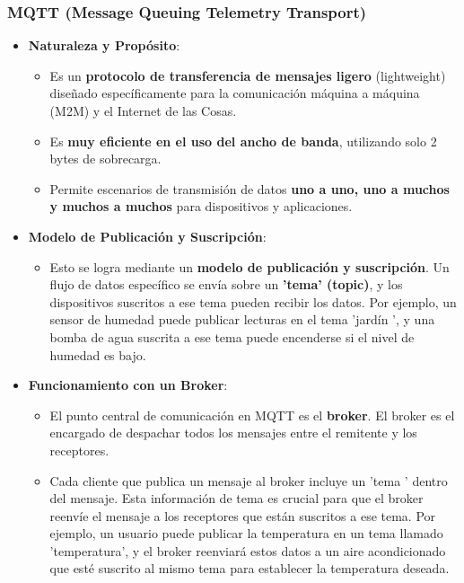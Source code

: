 \documentclass{report}
\begin{document}
\subsubsection{MQTT (Message Queuing Telemetry Transport)}
\begin{itemize}
    \item \textbf{Naturaleza y Propósito}:
    \begin{itemize}
        \item Es un \textbf{protocolo de transferencia de mensajes ligero} (lightweight) diseñado específicamente para la comunicación máquina a 
        máquina (M2M) y el Internet de las Cosas.
        \item Es \textbf{muy eficiente en el uso del ancho de banda}, utilizando solo 2 bytes de sobrecarga.
        \item Permite escenarios de transmisión de datos \textbf{uno a uno, uno a muchos y muchos a muchos} para dispositivos y aplicaciones.
    \end{itemize}

    \item \textbf{Modelo de Publicación y Suscripción}:
    \begin{itemize}
        \item Esto se logra mediante un \textbf{modelo de publicación y suscripción}. Un flujo de datos específico se envía sobre un 
        \textbf{'tema' (topic)}, y los dispositivos suscritos a ese tema pueden recibir los datos. Por ejemplo, un sensor de humedad puede publicar 
        lecturas en el tema  'jardín ', y una bomba de agua suscrita a ese tema puede encenderse si el nivel de humedad es bajo.
    \end{itemize}

    \item \textbf{Funcionamiento con un Broker}:
    \begin{itemize}
        \item El punto central de comunicación en MQTT es el \textbf{broker}. El broker es el encargado de despachar todos los mensajes entre el 
        remitente y los receptores.
        \item Cada cliente que publica un mensaje al broker incluye un  'tema ' dentro del mensaje. Esta información de tema es crucial para que el 
        broker reenvíe el mensaje a los receptores que están suscritos a ese tema. Por ejemplo, un usuario puede publicar la temperatura en un tema 
        llamado 'temperatura', y el broker reenviará estos datos a un aire acondicionado que esté suscrito al mismo tema para establecer la temperatura 
        deseada.
    \end{itemize}


\end{itemize}
\end{document}
